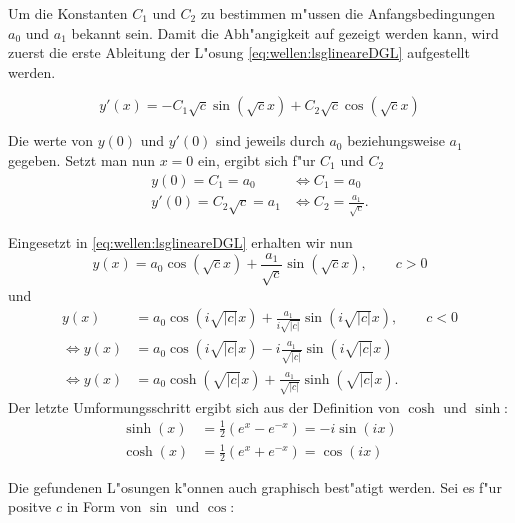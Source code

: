 Um die Konstanten $C_1$ und $C_2$ zu bestimmen m"ussen die Anfangsbedingungen 
$a_0$ und $a_1$ bekannt sein. Damit die Abh"angigkeit auf gezeigt werden kann, 
wird zuerst die erste Ableitung der L"osung \ref{eq:wellen:lsglineareDGL} 
aufgestellt werden.

\begin{equation}
	y'(x)=-C_1 \sqrt{c} \sin(\sqrt{c}x) + C_2 \sqrt{c} \cos(\sqrt{c}x)
\end{equation}

Die werte von $y(0)$ und $y'(0)$ sind jeweils durch $a_0$ beziehungsweise $a_1$ 
gegeben. Setzt man nun $x = 0$ ein, ergibt sich f"ur $C_1$ und $C_2$
\begin{equation}
	\begin{split}
		y(0) = C_1 = a_0 &\Leftrightarrow C_1 = a_0 \\
		y'(0) = C_2 \sqrt{c} = a_1 &\Leftrightarrow C_2 = \frac{a_1}{\sqrt{c}}.
	\end{split}
\end{equation}

Eingesetzt in \ref{eq:wellen:lsglineareDGL} erhalten wir nun
\begin{equation*}
	y(x) = a_0 \cos(\sqrt{c}x) + \frac{a_1}{\sqrt{c}} \sin(\sqrt{c}x), \qquad c 
	> 0
\end{equation*}
und
\begin{equation}
\begin{split}
	y(x) &= a_0 \cos(i\sqrt{|c|}x) + \frac{a_1}{i\sqrt{|c|}}\sin(i\sqrt{|c|}x), 
	\qquad c < 0\\
	\Leftrightarrow
	y(x) &= a_0 \cos(i\sqrt{|c|}x) - i\frac{a_1}{\sqrt{|c|}}\sin(i\sqrt{|c|}x)\\
	\Leftrightarrow
	y(x) &= a_0 \cosh(\sqrt{|c|}x) + \frac{a_1}{\sqrt{|c|}}\sinh(\sqrt{|c|}x).
\end{split}	
\end{equation}
Der letzte Umformungsschritt ergibt sich aus der Definition von $\cosh$ und 
$\sinh$:
\begin{equation*}
\begin{split}
	\sinh(x) &= \frac{1}{2} (e^x - e^{-x}) = -i \sin(ix)\\
	\cosh(x) &= \frac{1}{2} (e^x + e^{-x}) = \cos (ix)
\end{split}
\end{equation*}

Die gefundenen L"osungen k"onnen auch graphisch best"atigt werden. Sei es f"ur 
positve $c$ in Form von $\sin$ und $\cos$:

